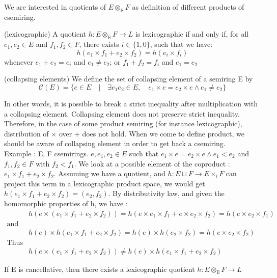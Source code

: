 We are interested in quotients of $E \otimes_{\mathbb{B}} F$ as definition of different products of csemiring.

\begin{definition}(lexicographic) A quotient $h: E \otimes_{\mathbb{B}} F \rightarrow L$ is lexicographic if and only if, for all $e_1,e_2 \in E$ and $f_1,f_2 \in F$, there exists $i \in \{1,0\}$, such that we have:
	$$h(e_1 \times f_1 + e_2 \times f_2)= h(e_i \times f_i)$$
	whenever $e_1+e_2=e_i$ and $e_1 \not = e_2$; or $f_1 + f_2 = f_i$ and $e_1=e_2$
\end{definition}
\noindent
\begin{definition}
	(collapsing elements) We define the set of collapsing element of a semiring E by $$\mathcal{C}(E) = \{e \in E \quad | \quad \exists e_1 e_2 \in E, \quad e_1 \times e = e_2 \times e \land e_1 \not = e_2  \}$$
\end{definition}
In other words, it is possible to break a strict inequality after multiplication with a collapsing element. Collapsing element does not preserve strict inequality. Therefore, in the case of some product semiring (for instance lexicographic), distribution of $\times$ over + does not hold. When we come to define product, we should be aware of collapsing element in order to get back a csemiring. \\

Example : E, F csemirings. $e,e_1,e_2 \in E$ such that $e_1 \times e = e_2 \times e \land e_1 < e_2$ and $f_1,f_2 \in F$ with $f_2<f_1 $. We look at a possible element of the coproduct : $e_1 \times f_1 + e_2 \times f_2$. Assuming we have a quotient, and $h : E \sqcup F \rightarrow E \times_l F$ can project this term in a lexicographic product space, we would get $h(e_1 \times f_1 + e_2 \times f_2) = (e_2,f_2)$. By distributivity law, and given the homomorphic properties of h, we have :
\begin{align*}
	&h(e \times (e_1 \times f_1 + e_2 \times f_2)) = h(e \times e_1 \times f_1 + e \times e_2 \times f_2) = h(e \times e_2 \times f_1) \quad \\ \text{and} \\
	 &h(e) \times h(e_1 \times f_1 + e_2 \times f_2) = h(e) \times h( e_2 \times f_2) = h(e \times e_2 \times f_2) \\ \text{Thus} \\
	 & h(e \times (e_1 \times f_1 + e_2 \times f_2)) \not= h(e) \times h(e_1 \times f_1 + e_2 \times f_2)
\end{align*}

\begin{lemma}
	If E is cancellative, then there exists a lexicographic quotient $h : E \otimes_{\mathbb{B}} F \rightarrow L$
\end{lemma}
